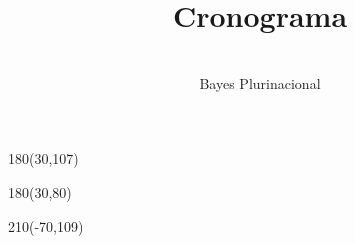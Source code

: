 \documentclass[a4paper,12pt]{article}
\title{Cronograma}
\author{\vspace{-0.8cm}\\ Bayes Plurinacional}
\date{}
\begin{document}


\phantom{.}
\vspace{-1.3cm}



\centering


%
%
%
%
%



%
%


\centering
\begin{textblock}{180}(30,107) \centering
\LARGE  \textcolor{black!95}{}
\end{textblock}
\begin{textblock}{180}(30,80) \centering
\LARGE \textcolor{black!95}{\scalebox{30}{$p$}}
\end{textblock}
\begin{textblock}{210}(-70,109) \centering
\LARGE \textcolor{black!95}{\scalebox{14.5}{$($}}
\end{textblock}
\end{document}
